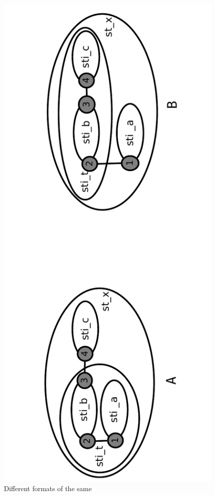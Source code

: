 \begin{figure}[htb]
  \begin{center}
    \includegraphics[angle=-90, scale=0.40]{./figs/diagram_SpeciesTypeUniqueness.pdf}
    \caption{Different formats of the same \speciesType}
    \label{fig:SpeciesTypeUniqueness}
  \end{center}
\end{figure}

